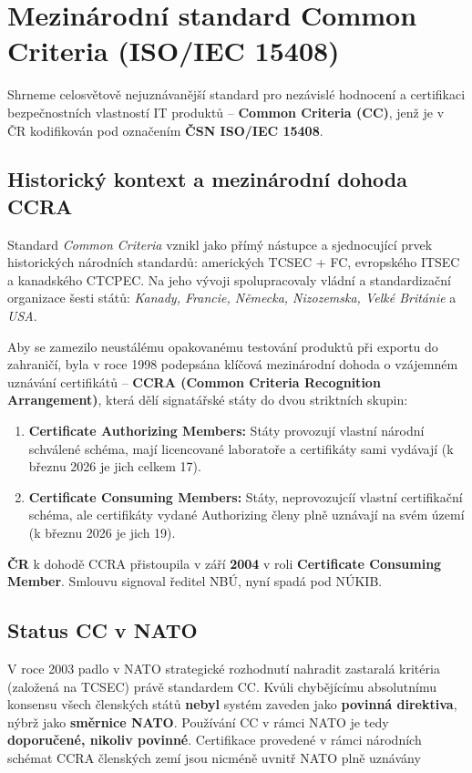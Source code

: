 \documentclass[10pt,a4paper]{article}
\begin{document}
	\section{Mezinárodní standard Common Criteria (ISO/IEC 15408)}
	
	Shrneme celosvětově nejuznávanější standard pro nezávislé hodnocení a certifikaci bezpečnostních vlastností IT produktů -- \textbf{Common Criteria (CC)}, jenž je v ČR kodifikován pod označením \textbf{ČSN ISO/IEC 15408}.
	
	\subsection{Historický kontext a mezinárodní dohoda CCRA}
	Standard \textit{Common Criteria} vznikl jako přímý nástupce a sjednocující prvek historických národních standardů: amerických TCSEC + FC, evropského ITSEC a kanadského CTCPEC. 
	Na jeho vývoji spolupracovaly vládní a standardizační organizace šesti států: \textit{Kanady, Francie, Německa, Nizozemska, Velké Británie} a \textit{USA}.
	
	Aby se zamezilo neustálému opakovanému testování produktů při exportu do zahraničí, byla v roce 1998 podepsána klíčová mezinárodní dohoda o vzájemném uznávání certifikátů -- \textbf{CCRA (Common Criteria Recognition Arrangement)}, která dělí signatářské státy do dvou striktních skupin:
	\begin{enumerate}
		\item \textbf{Certificate Authorizing Members:} Státy provozují vlastní národní schválené schéma, mají licencované laboratoře a certifikáty sami vydávají (k březnu 2026 je jich celkem 17).
		
		\item \textbf{Certificate Consuming Members:} Státy, neprovozujcíí vlastní certifikační schéma, ale certifikáty vydané Authorizing členy plně uznávají na svém území (k březnu 2026 je jich 19).
	\end{enumerate}
	
	\textbf{ČR} k dohodě CCRA přistoupila v září \textbf{2004} v roli \textbf{Certificate Consuming Member}. 
	Smlouvu signoval ředitel NBÚ, nyní spadá pod NÚKIB.
	
	\subsection{Status CC v NATO}
	V roce 2003 padlo v NATO strategické rozhodnutí nahradit zastaralá kritéria (založená na TCSEC) právě standardem CC. Kvůli chybějícímu absolutnímu konsensu všech členských států \textbf{nebyl} systém zaveden jako \textbf{povinná direktiva}, nýbrž jako \textbf{směrnice NATO}. 
	Používání CC v rámci NATO je tedy \textbf{doporučené, nikoliv povinné}. 
	Certifikace provedené v rámci národních schémat CCRA členských zemí jsou nicméně uvnitř NATO plně uznávány
	
\end{document}
